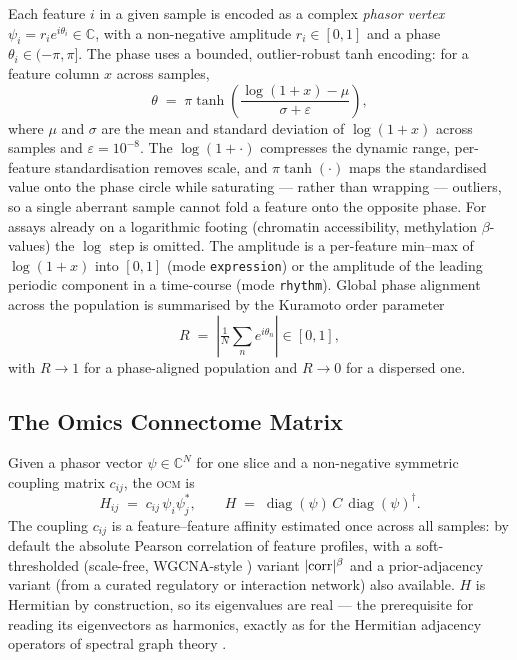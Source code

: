 \documentclass[preprint,12pt,amsmath,amssymb,superscriptaddress,floatfix]{revtex4-2}
\theoremstyle{definition}
\theoremstyle{plain}
\newcommand{\OCM}{\textsc{ocm}}
\begin{document}
Each feature $i$ in a given sample is encoded as a complex \emph{phasor vertex}
$\psi_i = r_i e^{i\theta_i}\in\mathbb{C}$, with a non-negative amplitude
$r_i\in[0,1]$ and a phase $\theta_i\in(-\pi,\pi]$. The phase uses a bounded,
outlier-robust tanh encoding: for a feature column $x$ across samples,
\begin{equation}
  \theta \;=\; \pi \tanh\!\left(\frac{\log(1+x)-\mu}{\sigma+\varepsilon}\right),
  \label{eq:phase}
\end{equation}
where $\mu$ and $\sigma$ are the mean and standard deviation of $\log(1+x)$
across samples and $\varepsilon=10^{-8}$. The $\log(1{+}\cdot)$ compresses the
dynamic range, per-feature standardisation removes scale, and $\pi\tanh(\cdot)$
maps the standardised value onto the phase circle while saturating --- rather
than wrapping --- outliers, so a single aberrant sample cannot fold a feature
onto the opposite phase. For assays already on a logarithmic footing (chromatin
accessibility, methylation $\beta$-values) the $\log$ step is omitted. The
amplitude is a per-feature min--max of $\log(1+x)$ into $[0,1]$ (mode
\texttt{expression}) or the amplitude of the leading periodic component in a
time-course (mode \texttt{rhythm}). Global phase alignment across the population
is summarised by the Kuramoto order parameter \citep{kuramoto1975}
\begin{equation}
  R \;=\; \left|\tfrac{1}{N}\textstyle\sum_n e^{i\theta_n}\right| \in [0,1],
  \label{eq:kuramoto}
\end{equation}
with $R\to1$ for a phase-aligned population and $R\to0$ for a dispersed one.

\subsection{The Omics Connectome Matrix}
\label{sec:theory-ocm}

Given a phasor vector $\psi\in\mathbb{C}^N$ for one slice and a non-negative
symmetric coupling matrix $c_{ij}$, the \OCM{} is
\begin{equation}
  H_{ij} \;=\; c_{ij}\,\psi_i\psi_j^{*},
  \qquad
  H \;=\; \operatorname{diag}(\psi)\,C\,\operatorname{diag}(\psi)^{\dagger}.
  \label{eq:ocm}
\end{equation}
The coupling $c_{ij}$ is a feature--feature affinity estimated once across all
samples: by default the absolute Pearson correlation of feature profiles, with a
soft-thresholded (scale-free, WGCNA-style \citep{langfelder2008wgcna}) variant
$|{\rm corr}|^{\beta}$ and a prior-adjacency variant (from a curated regulatory
or interaction network) also available. $H$ is Hermitian by construction, so its
eigenvalues are real --- the prerequisite for reading its eigenvectors as
harmonics, exactly as for the Hermitian adjacency operators of spectral graph
theory \citep{guo2017hermitian, chung1997spectral}.
\end{document}

